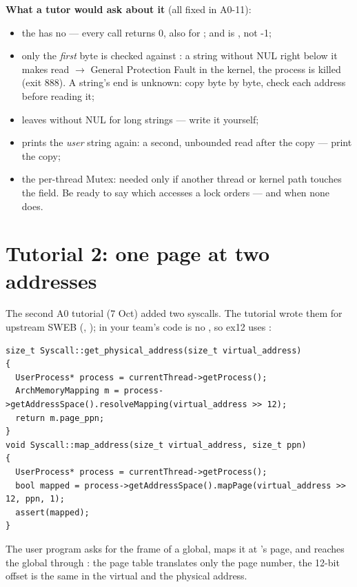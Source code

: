 \textbf{What a tutor would ask about it} (all fixed in A0-11):
\begin{itemize}
\item the  has no  --- every call returns 0, also for ;
  and  is , not -1;
\item only the \emph{first} byte is checked against : a string without NUL
  right below it makes  read  $\to$ General Protection Fault in
  the kernel, the process is killed (exit 888). A string's end is unknown: copy byte by byte,
  check each address before reading it;
\item {} leaves  without NUL for long strings --- write
  it yourself;
\item {} prints the \emph{user} string again: a second,
  unbounded read after the copy --- print the copy;
\item the per-thread Mutex: needed only if another thread or kernel path touches the field.
  Be ready to say which accesses a lock orders --- and when none does.
\end{itemize}

\section{Tutorial 2: one page at two addresses}
\label{sec:tutorial2}

The second A0 tutorial (7 Oct) added two syscalls. The tutorial wrote them for upstream SWEB
(, ); in your team's code
 is no , so ex12 uses :

\begin{lstlisting}[style=cpp]
size_t Syscall::get_physical_address(size_t virtual_address)
{
  UserProcess* process = currentThread->getProcess();
  ArchMemoryMapping m = process->getAddressSpace().resolveMapping(virtual_address >> 12);
  return m.page_ppn;
}
void Syscall::map_address(size_t virtual_address, size_t ppn)
{
  UserProcess* process = currentThread->getProcess();
  bool mapped = process->getAddressSpace().mapPage(virtual_address >> 12, ppn, 1);
  assert(mapped);
}
\end{lstlisting}

The user program asks for the frame of a global, maps it at 's page, and
reaches the global through : the page table translates
only the page number, the 12-bit offset is the same in the virtual and the physical address.

